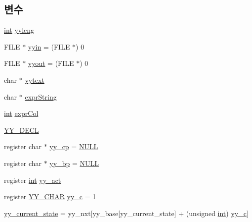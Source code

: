 \subsection*{변수}
\begin{DoxyCompactItemize}
\item 
\mbox{\hyperlink{_util_8cpp_a0ef32aa8672df19503a49fab2d0c8071}{int}} \mbox{\hyperlink{expr-lex_8cpp_a1b5865350b5ca5c1d69f429c2a652953}{yyleng}}
\item 
F\+I\+LE $\ast$ \mbox{\hyperlink{expr-lex_8cpp_a87a127afa8f6c307fbfba10390675406}{yyin}} = (F\+I\+LE $\ast$) 0
\item 
F\+I\+LE $\ast$ \mbox{\hyperlink{expr-lex_8cpp_a296847b42b0baa62e2af36cb79f3c0eb}{yyout}} = (F\+I\+LE $\ast$) 0
\item 
char $\ast$ \mbox{\hyperlink{expr-lex_8cpp_a35b96d819f6a8f8638894c429e68b02a}{yytext}}
\item 
char $\ast$ \mbox{\hyperlink{expr-lex_8cpp_aa1f704d92ffa441305e3434381d676f7}{expr\+String}}
\item 
\mbox{\hyperlink{_util_8cpp_a0ef32aa8672df19503a49fab2d0c8071}{int}} \mbox{\hyperlink{expr-lex_8cpp_a5aaef62994ad4e49e786f5228b548541}{expr\+Col}}
\item 
\mbox{\hyperlink{expr-lex_8cpp_abcefb20c54ce0f92452cfbb9cf657670}{Y\+Y\+\_\+\+D\+E\+CL}}
\item 
register char $\ast$ \mbox{\hyperlink{expr-lex_8cpp_aebf8322d98e81db5af081bb22a5f06fe}{yy\+\_\+cp}} = \mbox{\hyperlink{_system_8h_a070d2ce7b6bb7e5c05602aa8c308d0c4}{N\+U\+LL}}
\item 
register char $\ast$ \mbox{\hyperlink{expr-lex_8cpp_a71cf769ce518e8687bf8999b278c65f4}{yy\+\_\+bp}} = \mbox{\hyperlink{_system_8h_a070d2ce7b6bb7e5c05602aa8c308d0c4}{N\+U\+LL}}
\item 
register \mbox{\hyperlink{_util_8cpp_a0ef32aa8672df19503a49fab2d0c8071}{int}} \mbox{\hyperlink{expr-lex_8cpp_a7ffc8c947830757dd87ad202a6823edd}{yy\+\_\+act}}
\item 
register \mbox{\hyperlink{expr-lex_8cpp_a1f324b3cb0839eeb90145f0274e6946e}{Y\+Y\+\_\+\+C\+H\+AR}} \mbox{\hyperlink{expr-lex_8cpp_a2ce7598a28e3deb63b5ef934b031a93f}{yy\+\_\+c}} = 1
\item 
\mbox{\hyperlink{expr-lex_8cpp_abb8b9672f94e21056888ae611b41cd1b}{yy\+\_\+current\+\_\+state}} = yy\+\_\+nxt\mbox{[}yy\+\_\+base\mbox{[}yy\+\_\+current\+\_\+state\mbox{]} + (unsigned \mbox{\hyperlink{_util_8cpp_a0ef32aa8672df19503a49fab2d0c8071}{int}}) \mbox{\hyperlink{expr-lex_8cpp_a2ce7598a28e3deb63b5ef934b031a93f}{yy\+\_\+c}}\mbox{]}

\end{DoxyCompactItemize}
